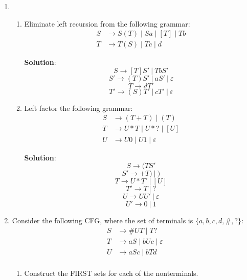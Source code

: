 \documentclass[11pt]{article}
\let\epsilon\varepsilon
\begin{document}
\begin{enumerate}
  \newpage

\item
  \begin{enumerate}
  \item Eliminate left recursion from the following grammar:
    \begin{equation*}
      \begin{split}
        S &\to S(T) \mid Sa \mid [ T ] \mid Tb \\
        T &\to T(S) \mid Tc \mid d
      \end{split}
    \end{equation*}

    \textbf{Solution}:
    $$S\to [T]S'\ |\ TbS'$$
    $$S'\to (T)S'\ |\ aS'\ |\ \epsilon$$
    $$T\to dT'$$
    $$T'\to (S)T'\ |\ cT'\ |\ \epsilon$$
    
  \item Left factor the following grammar:
    \begin{equation*}
      \begin{split}
        S &\to (T+T) \mid (T) \\
        T &\to U*T \mid U*? \mid [ U ] \\
        U &\to U0 \mid U1 \mid \epsilon 
      \end{split}
    \end{equation*}
    
    \textbf{Solution}:
    $$S\to (TS'$$
    $$S'\to +T)\ |\ )$$
    $$T\to U*T'\ |\ [U]$$
    $$T'\to T\ |\ ?$$
    $$U\to UU'\ |\ \epsilon$$
    $$U'\to 0\ |\ 1$$
  \end{enumerate}

  \newpage
  
\item Consider the following CFG, where the set of terminals is $\{a, b, c, d, \# , ?\}$:
  \begin{equation*}
    \begin{split}
      S &\to \# U T \mid T ? \\
      T &\to aS \mid bUc \mid \epsilon \\
      U &\to aSc \mid bTd \\
    \end{split}
  \end{equation*}

  \begin{enumerate}
  \item Construct the FIRST sets for each of the nonterminals.
    

\end{enumerate}
\end{enumerate}
\end{document}
